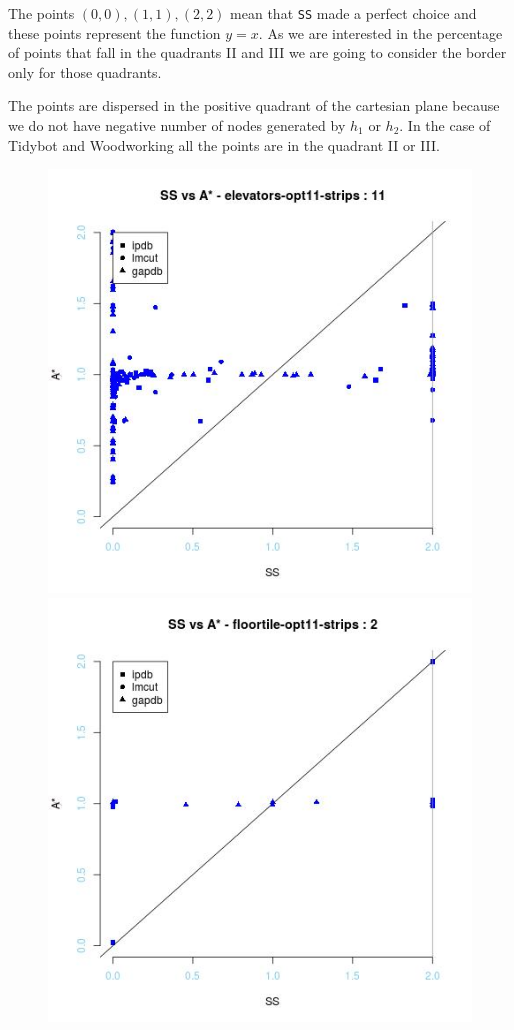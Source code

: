 The points $(0,0), (1,1), (2,2)$ mean that \texttt{SS} made a perfect choice and these points represent the function $y = x$. As we are interested in the percentage of points that fall in the quadrants II and III we are going to consider the border only for those quadrants.

The points are dispersed in the positive quadrant of the cartesian plane because we do not have negative number of nodes generated by $h_{1}$ or $h_{2}$. In the case of Tidybot and Woodworking all the points are in the quadrant II or III.

\begin{figure}[!htb]
  \includegraphics[width=\linewidth]{images/elevators-opt11-strips}
\endminipage\hfill
{}
  \includegraphics[width=\linewidth]{images/floortile-opt11-strips}

\end{figure}
